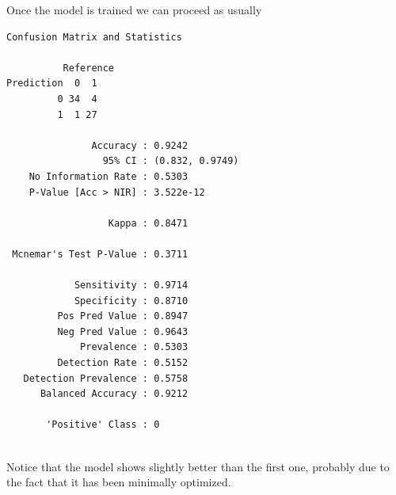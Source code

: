 \documentclass[
  letterpaper,
  DIV=11,
  numbers=noendperiod,
  oneside]{scrartcl}
\newenvironment{Shaded}{\begin{snugshade}}{\end{snugshade}}
\newcommand{\CommentTok}[1]{\textcolor[rgb]{0.37,0.37,0.37}{#1}}
\newcommand{\DecValTok}[1]{\textcolor[rgb]{0.68,0.00,0.00}{#1}}
\newcommand{\FloatTok}[1]{\textcolor[rgb]{0.68,0.00,0.00}{#1}}
\newcommand{\FunctionTok}[1]{\textcolor[rgb]{0.28,0.35,0.67}{#1}}
\newcommand{\NormalTok}[1]{\textcolor[rgb]{0.00,0.23,0.31}{#1}}
\newcommand{\OtherTok}[1]{\textcolor[rgb]{0.00,0.23,0.31}{#1}}
\newcommand{\SpecialCharTok}[1]{\textcolor[rgb]{0.37,0.37,0.37}{#1}}
\begin{document}
Once the model is trained we can proceed as usually

\begin{Shaded}
\end{Shaded}

\begin{verbatim}
Confusion Matrix and Statistics

          Reference
Prediction  0  1
         0 34  4
         1  1 27
                                         
               Accuracy : 0.9242         
                 95% CI : (0.832, 0.9749)
    No Information Rate : 0.5303         
    P-Value [Acc > NIR] : 3.522e-12      
                                         
                  Kappa : 0.8471         
                                         
 Mcnemar's Test P-Value : 0.3711         
                                         
            Sensitivity : 0.9714         
            Specificity : 0.8710         
         Pos Pred Value : 0.8947         
         Neg Pred Value : 0.9643         
             Prevalence : 0.5303         
         Detection Rate : 0.5152         
   Detection Prevalence : 0.5758         
      Balanced Accuracy : 0.9212         
                                         
       'Positive' Class : 0              
                                         
\end{verbatim}

Notice that the model shows slightly better than the first one, probably
due to the fact that it has been minimally optimized.
\end{document}
